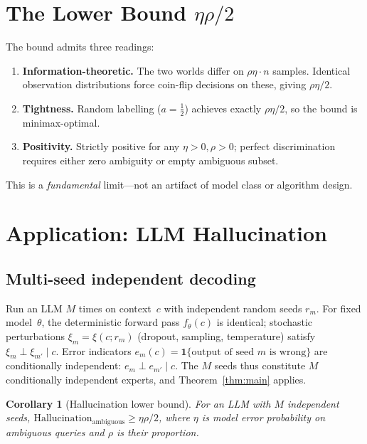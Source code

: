 \documentclass[10pt,a4paper]{article}
\newtheorem{corollary}[theorem]{Corollary}
\theoremstyle{definition}
\theoremstyle{remark}
\begin{document}
\section{The Lower Bound $\eta\rho/2$}

The bound admits three readings:
\begin{enumerate}[label=(\alph*)]
  \item \textbf{Information-theoretic.} The two worlds differ on $\rho\eta\cdot n$ samples.
        Identical observation distributions force coin-flip decisions on these, giving $\rho\eta/2$.
  \item \textbf{Tightness.} Random labelling ($a=\tfrac12$) achieves exactly $\rho\eta/2$,
        so the bound is minimax-optimal.
  \item \textbf{Positivity.} Strictly positive for any $\eta>0,\rho>0$; perfect
        discrimination requires either zero ambiguity or empty ambiguous subset.
\end{enumerate}
This is a \emph{fundamental} limit---not an artifact of model class or algorithm design.

\section{Application: LLM Hallucination}

\subsection*{Multi-seed independent decoding}

Run an LLM $M$ times on context~$c$ with independent random seeds $r_m$.  For fixed
model~$\theta$, the deterministic forward pass $f_\theta(c)$ is identical; stochastic
perturbations $\xi_m=\xi(c;r_m)$ (dropout, sampling, temperature) satisfy
$\xi_m\perp\xi_{m'}\!\mid\!c$.  Error indicators $e_m(c)=\mathbf{1}\{\text{output of seed }m\text{ is wrong}\}$
are conditionally independent: $e_m\perp e_{m'}\!\mid\!c$.  The $M$ seeds thus constitute
$M$ conditionally independent experts, and Theorem~\ref{thm:main} applies.

\begin{corollary}[Hallucination lower bound]\label{cor:hall}
For an LLM with $M$ independent seeds,
$\mathrm{Hallucination}_{\text{ambiguous}} \ge \eta\rho/2$,
where $\eta$ is model error probability on ambiguous queries and $\rho$ is their proportion.
\end{corollary}
\end{document}
